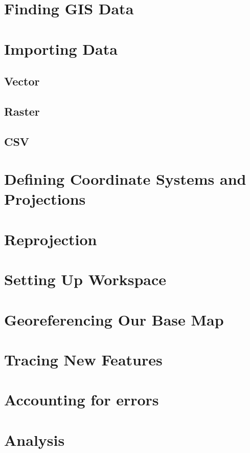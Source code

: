 \documentclass{article}
\begin{document}
\section{Finding GIS Data}

\section{Importing Data}

\subsection{Vector}

\subsection{Raster}

\subsection{CSV}

\section{Defining Coordinate Systems and Projections}

\section{Reprojection}

\section{Setting Up Workspace}

\section{Georeferencing Our Base Map}

\section{Tracing New Features}

\section{Accounting for errors}

\section{Analysis}
\end{document}
